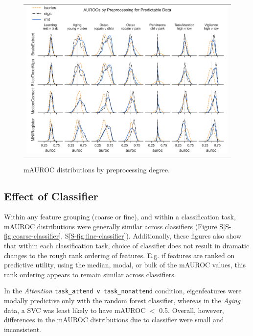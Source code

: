 \documentclass[12pt]{spieman}  %
\newcommand{\code}[1]{\small\texttt{#1}\normalsize}
\begin{document}
\begin{spacing}{2}
\begin{figure}
\begin{center}
\begin{tabular}{c}
\includegraphics[width=6.5in]{coarse_feature_by_preproc_predictive_subgroup.png}
\end{tabular}
\end{center}
\caption
{ \label{fig:preproc} mAUROC distributions by preprocessing degree.}
\end{figure}

\subsection{Effect of Classifier}
Within any feature grouping (coarse or fine), and within a classification task,
mAUROC distributions were generally similar across classifiers (Figure
S\ref{S-fig:coarse-classifier}, S\ref{S-fig:fine-classifier}). Additionally,
these figures also show that within each classification task, choice of
classifier does not result in dramatic changes to the rough rank ordering of
features. E.g. if features are ranked on predictive utility, using the median,
modal, or bulk of the  mAUROC values, this rank ordering appears to remain
similar across classifiers.

In the \textit{Attention} \code{task\_attend v task\_nonattend} condition,
eigenfeatures were modally predictive only with the random forest classifier,
whereas in the \textit{Aging} data, a SVC was least likely to have mAUROC \(<\)
0.5. Overall, however, differences in the mAUROC distributions due to
classifier were small and inconsistent.


\end{spacing}
\end{document}
